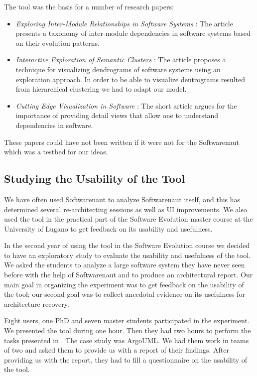 \documentclass[preprint,12pt]{elsarticle}
\begin{document}
The tool was the basis for a number of research papers: 
\begin{itemize}
\item {\em Exploring Inter-Module Relationships in Software Systems} \cite{lungu-relevo}: The article presents a taxonomy of inter-module dependencies in software systems based on their evolution patterns.
\item {\em Interactive Exploration of Semantic Clusters} \cite{lungu-clust}: The article proposes a technique for visualizing dendrograms of software systems using an exploration approach. In order to be able to visualize dentrograms resulted from hierarchical clustering we had to adapt our model.
\item {\em Cutting Edge Visualization in Software} \cite{lungu-cutedge}: The short article argues for the importance of providing detail views that allow one to understand dependencies in software.
\end{itemize}

These papers could have not been written if it were not for the Softwarenaut which was a testbed for our ideas. 


\subsection {Studying the Usability of the Tool}
\label{sec:usability}
We have often used Softwarenaut to analyze Softwarenaut itself, and this has determined several re-architecting sessions as well as UI improvements. We also used the tool in the practical part of the Software Evolution master course at the University of Lugano to get feedback on its usability and usefulness. 

In the second year of using the tool in the Software Evolution course we decided to have an exploratory study to evaluate the usability and usefulness of the tool. We asked the students to analyze a large software system they have never seen before with the help of Softwarenaut and to produce an architectural report. Our main goal in organizing the experiment was to get feedback on the usability of the tool; our second goal was to collect anecdotal evidence on its usefulness for architecture recovery.

Eight users, one PhD and seven master students participated in the experiment. We presented the tool during one hour. Then they had two hours to perform the tasks presented in . The case study was ArgoUML. We had them work in teams of two and asked them to provide us with a report of their findings. After providing us with the report, they had to fill a questionnaire on the usability of the tool. 
\end{document}
